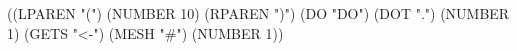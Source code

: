 \begin{CodeBlock}
((LPAREN "(")
 (NUMBER 10)
 (RPAREN ")")
 (DO "DO")
 (DOT ".")
 (NUMBER 1)
 (GETS "<-")
 (MESH "#")
 (NUMBER 1))

\end{CodeBlock}
